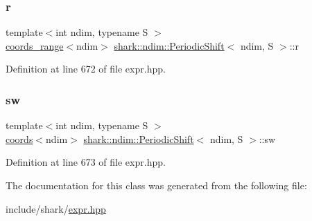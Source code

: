 \subsubsection{\texorpdfstring{r}{r}}
{\footnotesize\ttfamily template$<$int ndim, typename S $>$ \\
\hyperlink{structshark_1_1ndim_1_1coords__range}{coords\+\_\+range}$<$ndim$>$ \hyperlink{classshark_1_1ndim_1_1_periodic_shift}{shark\+::ndim\+::\+Periodic\+Shift}$<$ ndim, S $>$\+::r\hspace{0.3cm}{\ttfamily [private]}}



Definition at line 672 of file expr.\+hpp.

\hypertarget{classshark_1_1ndim_1_1_periodic_shift_aded04c5bc0760cfb247590c85921b653}{}\label{classshark_1_1ndim_1_1_periodic_shift_aded04c5bc0760cfb247590c85921b653} 
\subsubsection{\texorpdfstring{sw}{sw}}
{\footnotesize\ttfamily template$<$int ndim, typename S $>$ \\
\hyperlink{structshark_1_1ndim_1_1coords}{coords}$<$ndim$>$ \hyperlink{classshark_1_1ndim_1_1_periodic_shift}{shark\+::ndim\+::\+Periodic\+Shift}$<$ ndim, S $>$\+::sw\hspace{0.3cm}{\ttfamily [private]}}



Definition at line 673 of file expr.\+hpp.



The documentation for this class was generated from the following file\+:\begin{DoxyCompactItemize}
\item 
include/shark/\hyperlink{expr_8hpp}{expr.\+hpp}\end{DoxyCompactItemize}
